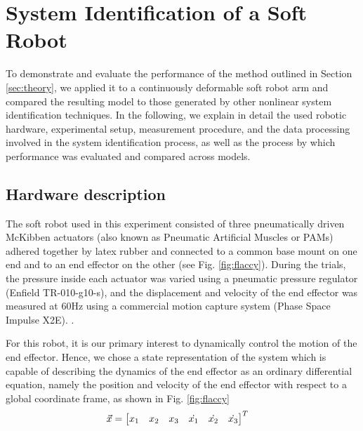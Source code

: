 \section{System Identification of a Soft Robot}
\label{sec:experiment}

To demonstrate and evaluate the performance of the method outlined in Section \ref{sec:theory}, we applied it to a continuously deformable soft robot arm and compared the resulting model to those generated by other nonlinear system identification techniques.
In the following, we explain in detail the used robotic hardware, experimental setup, measurement procedure, and the data processing involved in the system identification process, as well as the process by which performance was evaluated and compared across models.


\subsection{Hardware description}

The soft robot used in this experiment consisted of three pneumatically driven McKibben actuators (also known as Pneumatic Artificial Muscles or PAMs) adhered together by latex rubber and connected to a common base mount on one end and to an end effector on the other (see Fig. \ref{fig:flaccy}).
During the trials, the pressure inside each actuator was varied using a pneumatic pressure regulator (Enfield TR-010-g10-s), and the displacement and velocity of the end effector was measured at $60 \text{Hz}$ using a commercial motion capture system (Phase Space Impulse X2E).
.

For this robot, it is our primary interest to dynamically control the motion of the end effector.
Hence, we chose a state representation of the system which is capable of describing the dynamics of the end effector as an ordinary differential equation, namely the position and velocity of the end effector with respect to a global coordinate frame, as shown in Fig. \ref{fig:flaccy}
\begin{align}
    \vec{x} &= \begin{bmatrix}  x_1 & x_2 & x_3 & \dot{x_1} & \dot{x_2} & \dot{x_3}  \end{bmatrix}^T
    \label{eq:state}
\end{align}

